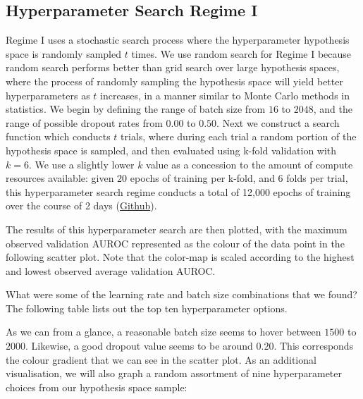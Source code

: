 \subsection{Hyperparameter Search Regime I}

Regime I uses a stochastic search process where the hyperparameter hypothesis space is randomly sampled \(t\) times. We use random search for Regime I because random search performs better than grid search over large hypothesis spaces, where the process of randomly sampling the hypothesis space will yield better hyperparameters as \(t\) increases, in a manner similar to Monte Carlo methods in statistics. \autocite{randomsearch} We begin by defining the range of batch size from \(16\) to \(2048\), and the range of possible dropout rates from \(0.00\) to \(0.50\). Next we construct a search function which conducts \(t\) trials, where during each trial a random portion of the hypothesis space is sampled, and then evaluated using k-fold validation with \(k = 6\). We use a slightly lower \(k\) value as a concession to the amount of compute resources available: given \(20\) epochs of training per k-fold, and \(6\) folds per trial, this hyperparameter search regime conducts a total of 12,000 epochs of training over the course of 2 days (\href{https://github.com/ShenZhouHong/radiography-ai-project/blob/master/python/hyperparam-search/regime-1.ipynb}{Github}).



\noindent
The results of this hyperparameter search are then plotted, with the maximum observed validation AUROC represented as the colour of the data point in the following scatter plot. Note that the color-map is scaled according to the highest and lowest observed average validation AUROC.



\noindent
What were some of the learning rate and batch size combinations that we found? The following table lists out the top ten hyperparameter options.



\noindent
As we can from a glance, a reasonable batch size seems to hover between \(1500\) to \(2000\). Likewise, a good dropout value seems to be around \(0.20\). This corresponds the colour gradient that we can see in the scatter plot. As an additional visualisation, we will also graph a random assortment of nine hyperparameter choices from our hypothesis space sample:

